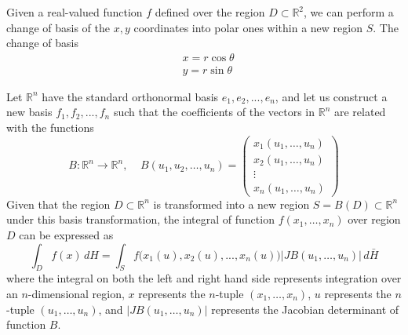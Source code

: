   \begin{example}
  Given a real-valued function $f$ defined over the region $D \subset \mathbb{R}^2$, we can perform a change of basis of the $x, y$ coordinates into polar ones within a new region $S$. The change of basis 
  \begin{align*}
      & x = r \cos{\theta} \\
      & y = r \sin{\theta} 
  \end{align*}
  \begin{center}
  \end{center}
  \end{example}

  \begin{theorem}
    Let $\mathbb{R}^n$ have the standard orthonormal basis $e_1, e_2, ..., e_n$, and let us construct a new basis $f_1, f_2, ..., f_n$ such that the coefficients of the vectors in $\mathbb{R}^n$ are related with the functions
    \[B: \mathbb{R}^n \longrightarrow \mathbb{R}^n, \;\;\;\; B(u_1, u_2, \ldots, u_n) = \begin{pmatrix}
    x_1 (u_1, \ldots, u_n) \\x_2 (u_1, \ldots, u_n) \\ \vdots \\ x_n (u_1, \ldots, u_n)
    \end{pmatrix}\]
    Given that the region $D \subset \mathbb{R}^n$ is transformed into a new region $S = B(D) \subset \mathbb{R}^n$ under this basis transformation, the integral of function $f(x_1, \ldots, x_n)$ over region $D$ can be expressed as 
    \[\int_D f(x) \, dH = \int_S f \big( x_1(u), x_2(u), ..., x_n (u) \big) \big| J B(u_1, \ldots, u_n)\big| \, d \bar{H}\]
    where the integral on both the left and right hand side represents integration over an $n$-dimensional region, $x$ represents the $n$-tuple $(x_1, \ldots, x_n)$, $u$ represents the $n$-tuple $(u_1, \ldots, u_n)$, and $\big| J B(u_1, \ldots, u_n)\big|$ represents the Jacobian determinant of function $B$. 
  \end{theorem}


